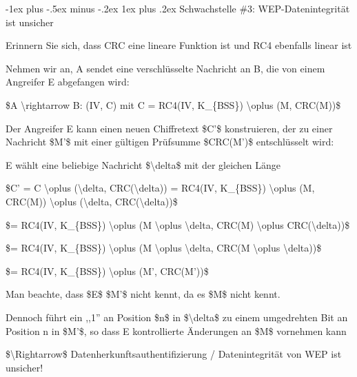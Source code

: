 \documentclass[a4paper]{article}
\makeatletter
\renewcommand{\subsubsection}{\@startsection{subsubsection}{3}{0mm}%
 {-1ex plus -.5ex minus -.2ex}%
 {1ex plus .2ex}%
 {\normalfont\small\bfseries}}
\makeatother
\begin{document}
\begin{multicols}{3}
      \subsubsection{Schwachstelle \#3: WEP-Datenintegrität ist
            unsicher}

      \begin{itemize*}
            \item Erinnern Sie sich, dass CRC eine lineare Funktion ist und RC4
            ebenfalls linear ist
            \item Nehmen wir an, A sendet eine verschlüsselte Nachricht an B, die von
            einem Angreifer E abgefangen wird:
            \begin{itemize*}
                  \item \$A \textbackslash rightarrow B: (IV, C) mit C = RC4(IV, K\_\{BSS\}) \textbackslash oplus (M, CRC(M))\$
            \end{itemize*}
            \item Der Angreifer E kann einen neuen Chiffretext \$C'\$ konstruieren, der
            zu einer Nachricht \$M'\$ mit einer gültigen Prüfsumme \$CRC(M')\$
            entschlüsselt wird:
            \begin{itemize*}
                  \item E wählt eine beliebige Nachricht \$\textbackslash delta\$ mit der gleichen Länge
                  \item \$C' = C \textbackslash oplus (\textbackslash delta, CRC(\textbackslash delta)) = RC4(IV, K\_\{BSS\}) \textbackslash oplus (M, CRC(M)) \textbackslash oplus (\textbackslash delta, CRC(\textbackslash delta))\$
                  \item \$= RC4(IV, K\_\{BSS\}) \textbackslash oplus (M \textbackslash oplus \textbackslash delta, CRC(M) \textbackslash oplus CRC(\textbackslash delta))\$
                  \item \$= RC4(IV, K\_\{BSS\}) \textbackslash oplus (M \textbackslash oplus \textbackslash delta, CRC(M \textbackslash oplus \textbackslash delta))\$
                  \item \$= RC4(IV, K\_\{BSS\}) \textbackslash oplus (M', CRC(M'))\$
                  \item Man beachte, dass \$E\$ \$M'\$ nicht kennt, da es \$M\$ nicht kennt.
                  \item Dennoch führt ein ,,1'' an Position \$n\$ in \$\textbackslash delta\$ zu einem umgedrehten Bit an Position n in \$M'\$, so dass E kontrollierte Änderungen an \$M\$ vornehmen kann
                  \item \$\textbackslash Rightarrow\$ Datenherkunftsauthentifizierung / Datenintegrität von WEP ist unsicher!
            \end{itemize*}
      \end{itemize*}



\end{multicols}
\end{document}
